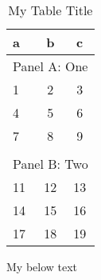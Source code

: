 \begin{table}
\centering
\begin{threeparttable}
\caption{My Table Title}
\begin{tabular}{lcc}
\toprule
a & b & c\\
\midrule
\multicolumn{3}{l}{Panel A: One}\\
1 & 2 & 3 \\
4 & 5 & 6 \\
7 & 8 & 9 \\
  &   &  \\
\multicolumn{3}{l}{Panel B: Two}\\
11 & 12 & 13 \\
14 & 15 & 16 \\
17 & 18 & 19 \\
\bottomrule

\end{tabular}
\begin{tablenotes}
My below text
\end{tablenotes}
\end{threeparttable}
\end{table}